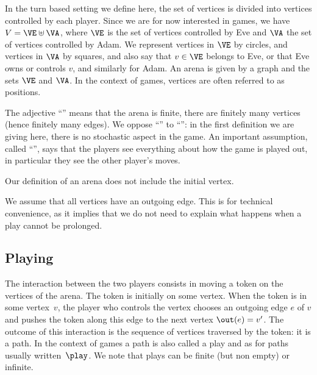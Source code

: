 \documentclass[letterpaper,10pt,english]{sphinxmanual}
\begin{document}
In the turn based setting we define here, the set of vertices is divided
into vertices controlled by each player. Since we are for now interested
in  games, we have \(V = \VE \uplus \VA\), where \(\VE\) is the
set of vertices controlled by Eve and \(\VA\) the set of vertices
controlled by Adam. We represent vertices in \(\VE\) by circles, and
vertices in \(\VA\) by squares, and also say that \(v \in \VE\) belongs to
Eve, or that Eve owns or controls \(v\), and similarly for Adam. An arena
is given by a graph and the sets \(\VE\) and \(\VA\). In the context of
games, vertices are often referred to as positions.

The adjective “” means that the arena is finite, 
there are finitely many vertices (hence finitely many edges). We oppose
“” to “”: in the first definition we are
giving here, there is no stochastic aspect in the game. An important
assumption, called “”, says that the players see
everything about how the game is played out, in particular they see the
other player’s moves.

Our definition of an arena does not include the initial vertex.

We assume that all vertices have an outgoing edge. This is for technical
convenience, as it implies that we do not need to explain what happens
when a play cannot be prolonged.


\subsection{Playing}
\label{\detokenize{1_Introduction/simple:playing}}\label{\detokenize{1_Introduction/simple:subsec-playing}}
The interaction between the two players consists in moving a token on
the vertices of the arena. The token is initially on some vertex. When
the token is in some vertex \(v\), the player who controls the vertex
chooses an outgoing edge \(e\) of \(v\) and pushes the token along this edge
to the next vertex \(\out(e) = v'\). The outcome of this interaction is
the sequence of vertices traversed by the token: it is a path. In the
context of games a path is also called a play and as for paths
usually written \(\play\). We note that plays can be finite (but non
empty) or infinite.
\end{document}
